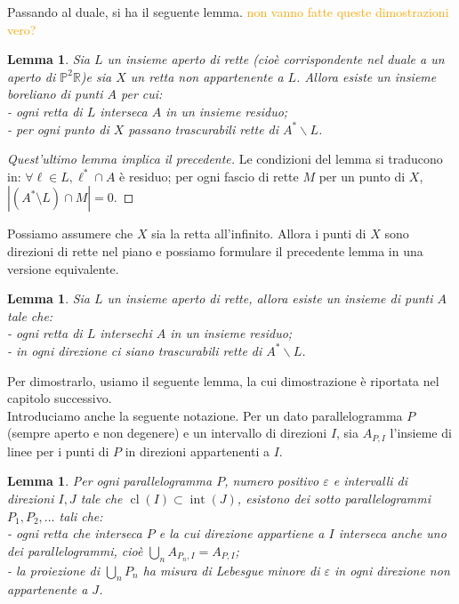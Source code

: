 \documentclass[a4paper, twoside,openright]{article}
\newcommand{\R}{\mathbb{R}}
\renewcommand{\P}{\mathbb{P}}
\newcommand{\fa}{\forall}
\newcommand{\<}{\langle}
\renewcommand{\>}{\rangle}
\newtheorem{lemma}[teo]{Lemma}
\begin{document}
Passando al duale, si ha il seguente lemma. \textcolor{orange}{non vanno fatte queste dimostrazioni vero?}

\begin{lemma}
Sia $L$ un insieme aperto di rette (cioè corrispondente nel duale a un aperto di $\P^2 \R$)e sia $X$ un retta non appartenente a $L$. Allora esiste un insieme boreliano di punti $A$ per cui:\\
- ogni retta di $L$ interseca $A$ in un insieme residuo;\\
- per ogni punto di $X$ passano trascurabili rette di $A^{*} \backslash L$.
\end{lemma}

\begin{proof} [Quest'ultimo lemma implica il precedente]
	Le condizioni del lemma si traducono in: $\fa \ell \in L, \ell^* \cap A$ è residuo; per ogni fascio di rette $M$ per un punto di $X$, $|(A^* \setminus L)\cap M|=0$. 
	
	
\end{proof}

Possiamo assumere che $X$ sia la retta all'infinito. Allora i punti di $X$ sono direzioni di rette nel piano e possiamo formulare il precedente lemma in una versione equivalente.

\begin{lemma}
Sia $L$ un insieme aperto di rette, allora esiste un insieme di punti $A$ tale che:\\
- ogni retta di $L$ intersechi $A$ in un insieme residuo;\\
- in ogni direzione ci siano trascurabili rette di  $A^{*} \backslash L$.\\
\end{lemma}

Per dimostrarlo, usiamo il seguente lemma, la cui dimostrazione è riportata nel capitolo successivo.\\
Introduciamo anche la seguente notazione. Per un dato parallelogramma $P$ (sempre aperto e non degenere) e un intervallo di direzioni $I$, sia $A_{P, I}$ l'insieme di linee per i punti di $P$ in direzioni appartenenti a $I$.

\begin{lemma}
Per ogni parallelogramma $P$, numero positivo $\varepsilon$ e intervalli di direzioni $I, J$ tale che $\operatorname{cl}(I) \subset \operatorname{int}(J)$, esistono dei sotto parallelogrammi $P_{1}, P_{2}, \ldots$ tali che:\\
- ogni retta che interseca $P$ e la cui direzione appartiene a $I$ interseca anche uno dei parallelogrammi, cioè $\bigcup_{n} A_{P_{n}, I}=A_{P, I}$;\\
- la proiezione di $\bigcup_{n} P_{n}$ ha misura di Lebesgue minore di $\varepsilon$ in ogni direzione non appartenente a $J$.
\end{lemma}
\end{document}
